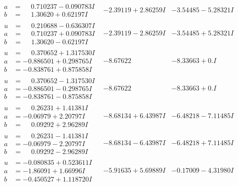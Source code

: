 \documentclass[1p]{elsarticle_modified}
\theoremstyle{definition}
\begin{document}
$$\begin{array}{c|c|c}
\begin{aligned}
a &= \phantom{-}0.710237 - 0.090783 I \\
b &= \phantom{-}1.30620 + 0.62197 I\end{aligned}
 & -2.39119 + 2.86259 I & -3.54485 - 5.28321 I \\ \hline\begin{aligned}
u &= \phantom{-}0.210688 - 0.636307 I \\
a &= \phantom{-}0.710237 + 0.090783 I \\
b &= \phantom{-}1.30620 - 0.62197 I\end{aligned}
 & -2.39119 - 2.86259 I & -3.54485 + 5.28321 I \\ \hline\begin{aligned}
u &= \phantom{-}0.370652 + 1.317530 I \\
a &= -0.886501 + 0.298765 I \\
b &= -0.838761 + 0.875858 I\end{aligned}
 & -8.67622\phantom{ +0.000000I} & -8.33663 + 0. I\phantom{ +0.000000I} \\ \hline\begin{aligned}
u &= \phantom{-}0.370652 - 1.317530 I \\
a &= -0.886501 - 0.298765 I \\
b &= -0.838761 - 0.875858 I\end{aligned}
 & -8.67622\phantom{ +0.000000I} & -8.33663 + 0. I\phantom{ +0.000000I} \\ \hline\begin{aligned}
u &= \phantom{-}0.26231 + 1.41381 I \\
a &= -0.06979 + 2.20797 I \\
b &= \phantom{-}0.09292 + 2.96289 I\end{aligned}
 & -8.68134 + 6.43987 I & -6.48218 - 7.11485 I \\ \hline\begin{aligned}
u &= \phantom{-}0.26231 - 1.41381 I \\
a &= -0.06979 - 2.20797 I \\
b &= \phantom{-}0.09292 - 2.96289 I\end{aligned}
 & -8.68134 - 6.43987 I & -6.48218 + 7.11485 I \\ \hline\begin{aligned}
u &= -0.080835 + 0.523611 I \\
a &= -1.86091 + 1.66996 I \\
b &= -0.450527 + 1.118720 I\end{aligned}
 & -5.91635 + 5.69889 I & -0.17009 - 4.31980 I \\ \hline\begin{aligned}

\end{aligned}
\end{array}$$
\end{document}

